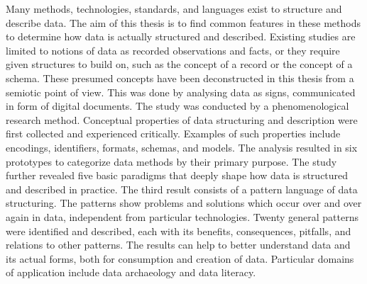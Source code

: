 Many methods, technologies, standards, and languages exist to structure and
describe data. The aim of this thesis is to find common features in these
methods to determine how data is actually structured and described. Existing
studies are limited to notions of data as recorded observations and facts, or
they require given structures to build on, such as the concept of a record or
the concept of a schema. These presumed concepts have been deconstructed in
this thesis from a semiotic point of view. This was done by analysing data as
signs, communicated in form of digital documents.  The study was conducted by a
phenomenological research method.  Conceptual properties of data structuring
and description were first collected and experienced critically. Examples of
such properties include encodings, identifiers, formats, schemas, and models.
The analysis resulted in six prototypes to categorize data methods by their
primary purpose. The study further revealed five basic paradigms that deeply
shape how data is structured and described in practice.  The third result
consists of a pattern language of data structuring.  The patterns show problems
and solutions which occur over and over again in data, independent from
particular technologies.  Twenty general patterns were identified and
described, each with its benefits, consequences, pitfalls, and relations to
other patterns. The results can help to better understand data and its actual
forms, both for consumption and creation of data. Particular domains of
application include data archaeology and data literacy.


